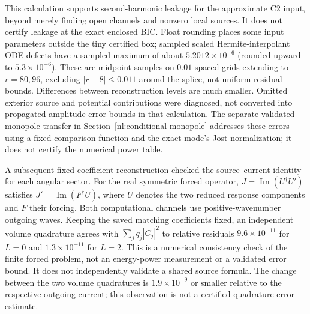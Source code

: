 This calculation supports second-harmonic leakage for the approximate C2
input, beyond merely finding open channels and nonzero local sources.
It does not certify leakage at the exact enclosed BIC. Float rounding
places some input parameters outside the tiny certified box; sampled
scaled Hermite-interpolant ODE defects have a sampled maximum of about
$5.2012\times10^{-6}$ (rounded upward to $5.3\times10^{-6}$).
These are midpoint samples on $0.01$-spaced grids extending to $r=80,96$,
excluding $|r-8|\le0.011$ around the splice, not uniform residual bounds.
Differences between reconstruction levels are much smaller. Omitted exterior
source and potential contributions were diagnosed, not converted into
propagated amplitude-error bounds in that calculation. The separate
validated monopole transfer in Section~\ref{nl:conditional-monopole}
addresses these errors using a fixed comparison function and the exact
mode's Jost normalization; it does not certify the numerical power table.

A subsequent fixed-coefficient reconstruction checked the source--current
identity for each angular sector. For the real symmetric forced operator,
$J=\operatorname{Im}(U^\dagger U')$ satisfies
$J'=\operatorname{Im}(F^\dagger U)$, where $U$ denotes the two reduced
response components and $F$ their forcing. Both computational channels
use positive-wavenumber outgoing waves. Keeping the saved matching
coefficients fixed, an independent volume quadrature agrees with
$\sum_j q_j|C_j|^2$ to relative residuals $9.6\times10^{-11}$ for $L=0$
and $1.3\times10^{-11}$ for $L=2$. This is a numerical consistency check
of the finite forced problem, not an energy-power measurement or a
validated error bound. It does not independently validate a shared source
formula. The change between the two volume quadratures is
$1.9\times10^{-9}$ or smaller relative to the respective outgoing current;
this observation is not a certified quadrature-error estimate.
